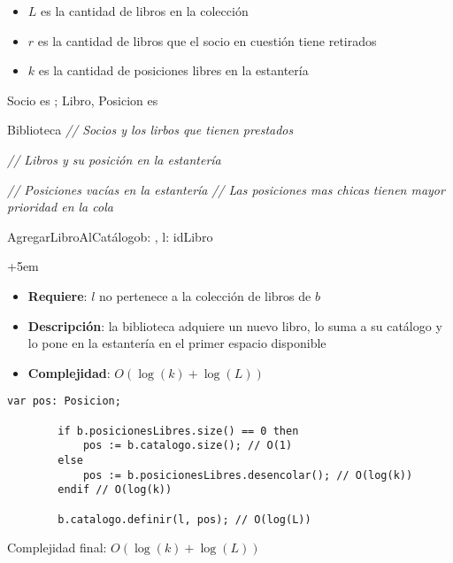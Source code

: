 \begin{itemize}
	\item $L$ es la cantidad de libros en la colección
	\item $r$ es la cantidad de libros que el socio en cuestión tiene retirados
	\item $k$ es la cantidad de posiciones libres en la estantería
\end{itemize}

Socio es \str; Libro, Posicion es \Int
\begin{module}{Biblioteca}{}{}{}
	\textit{// Socios y los lirbos que tienen prestados} \par
	\bigskip
	\textit{// Libros y su posición en la estantería} \par
	\bigskip
	\textit{// Posiciones vacías en la estantería}
	\textit{// Las posiciones mas chicas tienen mayor prioridad en la cola}
	\bigskip

	\begin{proc}{AgregarLibroAlCatálogo}{\Inout b: \moduletype, \In l: idLibro}{}
		\begin{adjustwidth}{+5em}{}
			\begin{itemize}
				\item \textbf{Requiere}: $l$ no pertenece a la colección de libros de $b$
				\item \textbf{Descripción}: la biblioteca adquiere un nuevo libro, lo suma a su catálogo y lo pone en la estantería en el primer espacio disponible
				\item \textbf{Complejidad}: $O(\log(k) + \log(L))$
			\end{itemize}
		\end{adjustwidth}

		\begin{lstlisting}[numbers=none,frame=none]
		var pos: Posicion;

		if b.posicionesLibres.size() == 0 then
			pos := b.catalogo.size(); // O(1)
		else
			pos := b.posicionesLibres.desencolar(); // O(log(k))
		endif // O(log(k))

		b.catalogo.definir(l, pos); // O(log(L))
		\end{lstlisting}
		Complejidad final: $O(\log(k) + \log(L))$
	\end{proc}


\end{module}
